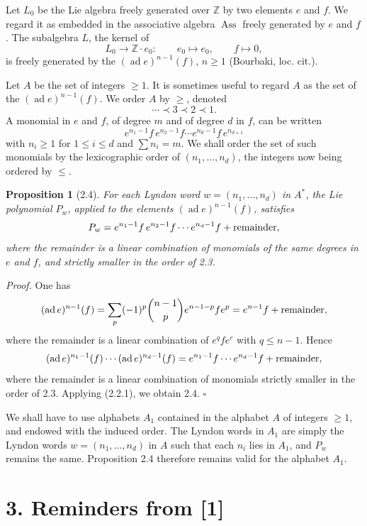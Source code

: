 \documentclass[10pt,a4paper]{article}
\newcommand{\Z}{\mathbb Z}
\newcommand{\Ass}{\operatorname{Ass}}
\newcommand{\ad}{\operatorname{ad}}
\theoremstyle{deligne}
\newtheorem*{proposition*}{Proposition}
\newenvironment{proofdel}{\textit{Proof.}}{\hfill$\square$}
\newcommand{\heading}[1]{\vspace{0.65em}\noindent{\bfseries #1}\quad}
\begin{document}
\heading{2.3.} Let \(L_0\) be the Lie algebra freely generated over \(\Z\) by two elements \(e\) and \(f\). We regard it as embedded in the associative algebra \(\Ass\) freely generated by \(e\) and \(f\). The subalgebra \(L\), the kernel of
\[
\tag{2.3.1}
L_0\longrightarrow \Z\cdot e_0:\qquad e_0\longmapsto e_0,
\qquad f\longmapsto 0,
\]
is freely generated by the \((\ad e)^{n-1}(f)\), \(n\ge1\) (Bourbaki, loc. cit.).

Let \(A\) be the set of integers \(\ge1\). It is sometimes useful to regard \(A\) as the set of the \((\ad e)^{n-1}(f)\). We order \(A\) by \(\ge\), denoted
\[
\cdots\prec 3\prec 2\prec 1.
\]
A monomial in \(e\) and \(f\), of degree \(m\) and of degree \(d\) in \(f\), can be written
\[
e^{n_1-1}f\,e^{n_2-1}f\cdots e^{n_d-1}f\,e^{n_{d+1}}
\]
with \(n_i\ge1\) for \(1\le i\le d\) and \(\sum n_i=m\). We shall order the set of such monomials by the lexicographic order of \((n_1,\ldots,n_d)\), the integers now being ordered by \(\le\).

\begin{proposition*}[2.4]
For each Lyndon word \(w=(n_1,\ldots,n_d)\) in \(A^*\), the Lie polynomial \(P_w\), applied to the elements \((\ad e)^{n-1}(f)\), satisfies
\[
P_w=e^{n_1-1}f\,e^{n_2-1}f\cdots e^{n_d-1}f+\hbox{remainder},
\]
where the remainder is a linear combination of monomials of the same degrees in \(e\) and \(f\), and strictly smaller in the order of 2.3.
\end{proposition*}

\begin{proofdel}
One has
\[
(\ad e)^{n-1}(f)=\sum_p(-1)^p\binom{n-1}{p}e^{n-1-p}fe^p
=e^{n-1}f+\hbox{remainder},
\]
where the remainder is a linear combination of \(e^qfe^r\) with \(q\le n-1\). Hence
\[
(\ad e)^{n_1-1}(f)\cdots(\ad e)^{n_d-1}(f)
=e^{n_1-1}f\cdots e^{n_d-1}f+\hbox{remainder},
\]
where the remainder is a linear combination of monomials strictly smaller in the order of 2.3. Applying (2.2.1), we obtain 2.4.
\end{proofdel}

\heading{2.5.} We shall have to use alphabets \(A_1\) contained in the alphabet \(A\) of integers \(\ge1\), and endowed with the induced order. The Lyndon words in \(A_1\) are simply the Lyndon words \(w=(n_1,\ldots,n_d)\) in \(A\) such that each \(n_i\) lies in \(A_1\), and \(P_w\) remains the same. Proposition 2.4 therefore remains valid for the alphabet \(A_1\).


\section*{3. Reminders from [1]}
\end{document}
